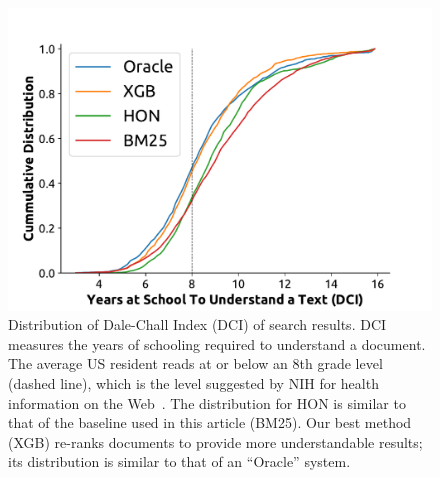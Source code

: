 \begin{figure}[t!]
   \centering
   \includegraphics[width=.41\textwidth]{graphics/cumdist}
    \caption{Distribution of Dale-Chall Index (DCI) of search results. DCI measures the years of schooling required to understand a document. The average US resident reads at or below an 8th grade level (dashed line)\cite{cowan04,wallace04,davis04,stossel12}, which is the level suggested by NIH for health information on the Web~\cite{clear94}. The distribution for HON is similar to that of the baseline used in this article (BM25). Our best method (XGB) re-ranks documents to provide more understandable results; its distribution is similar to that of an ``Oracle'' system.}
   \label{fig:dist}
\end{figure}


